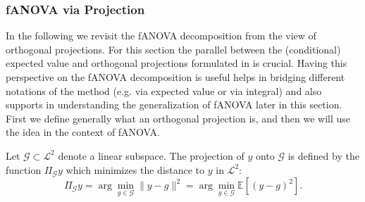 \subsubsection{fANOVA via Projection}
In the following we revisit the fANOVA decomposition from the view of orthogonal projections.
For this section the parallel between the (conditional) expected value and orthogonal projections formulated in \cite{Vaart_1998} is crucial.
Having this perspective on the fANOVA decomposition is useful helps in bridging different notations of the method (e.g. via expected value or via integral) and also supports in understanding the generalization of fANOVA later in this section. First we define generally what an orthogonal projection is, and then we will use the idea in the context of fANOVA.\par

\begin{definition}
    Let $\mathcal{G} \subset \mathcal{L}^2$ denote a linear subspace. The projection of $y$ onto $\mathcal{G}$ is defined by the function $\Pi_{\mathcal{G}}y$ which minimizes the distance to $y$ in $\mathcal{L}^2$:
\[
\Pi_{\mathcal{G}}y = \arg\min_{g \in \mathcal{G}} \|y - g\|^2
= \arg\min_{g \in \mathcal{G}} \mathbb{E}[(y - g)^2].
\]
\end{definition}

